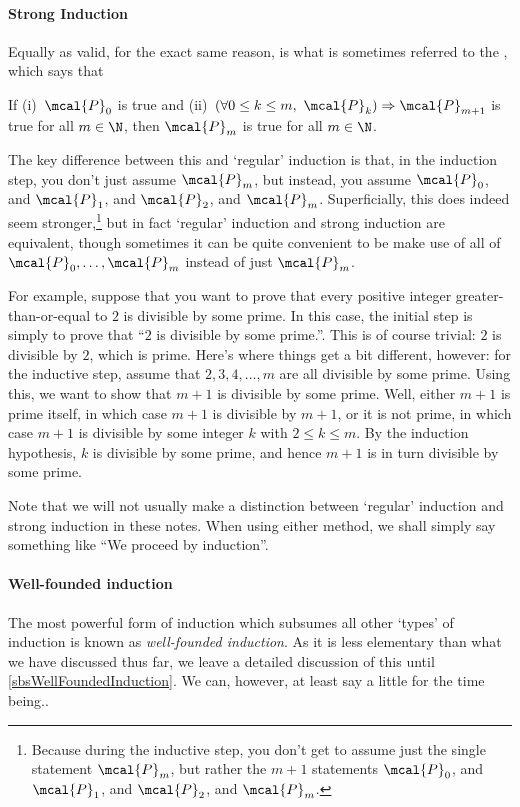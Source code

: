 \paragraph{Strong Induction} Equally as valid, for the exact same reason, is what is sometimes referred to the , which says that
\begin{important}
If (i)~$\mcal{P}_0$ is true and (ii)~$(\forall 0\leq k\leq m,\ \mcal{P}_k)\Rightarrow \mcal{P}_{m+1}$ is true for all $m\in \N$, then $\mcal{P}_m$ is true for all $m\in \N$.
\end{important}
The key difference between this and `regular' induction is that, in the induction step, you don't just assume $\mcal{P}_m$, but instead, you assume $\mcal{P}_0$, and $\mcal{P}_1$, and $\mcal{P}_2$, and \textellipsis $\mcal{P}_m$.  Superficially, this does indeed seem stronger,\footnote{Because during the inductive step, you don't get to assume just the single statement $\mcal{P}_m$, but rather the $m+1$ statements $\mcal{P}_0$, and $\mcal{P}_1$, and $\mcal{P}_2$, and \textellipsis $\mcal{P}_m$.} but in fact `regular' induction and strong induction are equivalent, though sometimes it can be quite convenient to be make use of all of $\mcal{P}_0,\ldots ,\mcal{P}_m$ instead of just $\mcal{P}_m$.

For example, suppose that you want to prove that every positive integer greater-than-or-equal to $2$ is divisible by some prime.  In this case, the initial step is simply to prove that ``$2$ is divisible by some prime.''.  This is of course trivial:  $2$ is divisible by $2$, which is prime.  Here's where things get a bit different, however:  for the inductive step, assume that $2,3,4,\ldots ,m$ are all divisible by some prime.  Using this, we want to show that $m+1$ is divisible by some prime.  Well, either $m+1$ is prime itself, in which case $m+1$ is divisible by $m+1$, or it is not prime, in which case $m+1$ is divisible by some integer $k$ with $2\leq k\leq m$.  By the induction hypothesis, $k$ is divisible by some prime, and hence $m+1$ is in turn divisible by some prime.

Note that we will not usually make a distinction between `regular' induction and strong induction in these notes.  When using either method, we shall simply say something like ``We proceed by induction\textellipsis ''.

\paragraph{Well-founded induction} The most powerful form of induction which subsumes all other `types' of induction is known as \emph{well-founded induction}.  As it is less elementary than what we have discussed thus far, we leave a detailed discussion of this until \cref{sbsWellFoundedInduction}.  We can, however, at least say a little for the time being..

